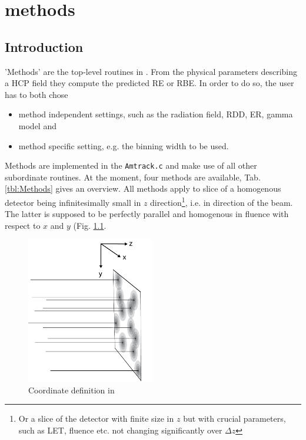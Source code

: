 
\chapter{\la{} methods}

\section{Introduction}
'Methods' are the top-level routines in \la{}. From the physical parameters describing a HCP field they compute the predicted RE or RBE. In order to do so, the user has to both chose 
\begin{itemize}
\item{method independent settings, such as the radiation field, RDD, ER, gamma model and}
\item{method specific setting, e.g. the binning width to be used.}
\end{itemize}

Methods are implemented in the \texttt{Amtrack.c} and make use of all other subordinate routines. At the moment, four methods are available, Tab. \ref{tbl:Methods} gives an overview. All 	methods apply to slice of a homogenous detector being infinitesimally small in $z$ direction\footnote{Or a slice of the detector with finite size in $z$ but with crucial parameters, such as LET, fluence etc. not changing significantly over $\Delta z$}, i.e. in direction of the beam. The latter is supposed to be perfectly parallel and homogenous in fluence with respect to $x$ and $y$ (Fig. \ref{fig:Coordinates}. 

\begin{figure}
	\centering
		\includegraphics[width=0.5\textwidth]{pictures/CoordinatesMethods.png}
	\caption{Coordinate definition in \la{}}
	\label{fig:Coordinates}
\end{figure}


